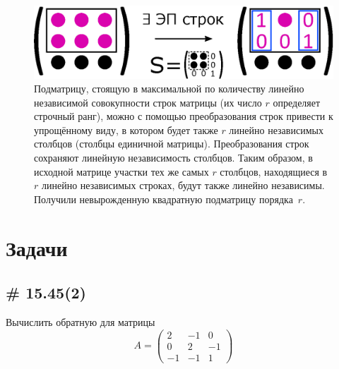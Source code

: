\documentclass[a4paper,12pt]{article}
\begin{document}
    \begin{figure}[h]
      \centering
    
      \includegraphics[width=0.8\columnwidth]{elem-submatrix}
    
      \caption{Подматрицу, стоящую в максимальной по количеству линейно независимой совокупности строк матрицы (их число $r$ определяет строчный ранг), можно с помощью преобразования строк привести к упрощённому виду, в котором будет также $r$ линейно независимых столбцов (столбцы единичной матрицы). Преобразования строк сохраняют линейную независимость столбцов. Таким образом, в исходной матрице участки тех же самых $r$ столбцов, находящиеся в $r$ линейно независимых строках, будут также линейно независимы. Получили невырожденную квадратную подматрицу порядка~$r$.}
      \label{fig:elem-submatrix}
    \end{figure}
  
  \section{Задачи}
  
  
  \subsection{\# 15.45(2)}
  
  Вычислить обратную для матрицы
  \[
    A = \begin{pmatrix}
      2 & -1 & 0\\
      0 & 2 & -1\\
      -1 & -1 & 1
    \end{pmatrix}
  \]
  
\end{document}
